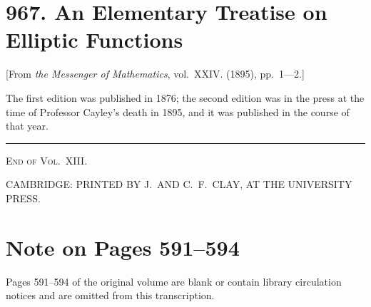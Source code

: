 \documentclass[11pt,a4paper]{book}
\begin{document}
\newpage
\section{967. An Elementary Treatise on Elliptic Functions}
\label{sec:967}

[From \textit{the Messenger of Mathematics}, vol.~XXIV. (1895), pp.~1---2.]
\bigskip

The first edition was published in 1876; the second edition was in the press at the time of Professor Cayley's death in 1895, and it was published in the course of that year.

\bigskip
\begin{center}
\rule{0.5\textwidth}{0.4pt}
\end{center}

\begin{center}
\textsc{End of Vol.~XIII.}
\end{center}

\bigskip
\begin{center}
CAMBRIDGE: PRINTED BY J.~AND C.~F.~CLAY, AT THE UNIVERSITY PRESS.
\end{center}

\newpage
\section*{Note on Pages 591--594}

Pages 591--594 of the original volume are blank or contain library circulation notices and are omitted from this transcription.
\clearpage
\end{document}

